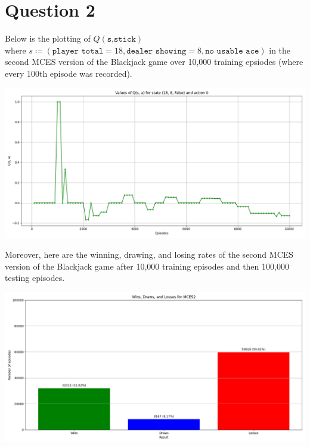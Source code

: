 \documentclass{article}
\begin{document}
\section*{Question 2}
Below is the plotting of $Q(\texttt{s,stick})$\\ 
where $s\coloneq(\texttt{player total} = 18, \texttt{dealer showing} = 8, \texttt{no usable ace})$
in the second MCES version of the Blackjack game over 10,000 training epsiodes (where every 100th episode was recorded).
\begin{center}
    \includegraphics[scale=0.4]{Q_values2.png}
\end{center}\par 
Moreover, here are the winning, drawing, and losing rates of the second MCES version of the Blackjack game after 10,000 training episodes and then 100,000 testing episodes.
\begin{center}
    \includegraphics[scale=0.4]{MCES2_Wins_Draws_Losses.png}
\end{center}
\end{document}
